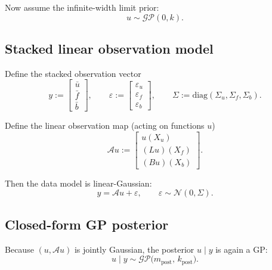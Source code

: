 \documentclass[11pt]{article}
\begin{document}
Now assume the infinite-width limit prior:
\begin{equation}
u \sim \mathcal{GP}(0,k).
\end{equation}

\subsection{Stacked linear observation model}

Define the stacked observation vector
\begin{equation}
y := \begin{bmatrix}
\bar u\\ \bar f\\ \bar b
\end{bmatrix},
\qquad
\varepsilon := \begin{bmatrix}
\varepsilon_u\\ \varepsilon_f\\ \varepsilon_b
\end{bmatrix},
\qquad
\Sigma := \mathrm{diag}(\Sigma_u,\Sigma_f,\Sigma_b).
\end{equation}

Define the linear observation map (acting on functions $u$)
\begin{equation}
\mathcal A u :=
\begin{bmatrix}
u(X_u)\\ (Lu)(X_f)\\ (Bu)(X_b)
\end{bmatrix}.
\end{equation}

Then the data model is linear-Gaussian:
\begin{equation}
y = \mathcal A u + \varepsilon,\qquad \varepsilon\sim \mathcal N(0,\Sigma).
\end{equation}

\subsection{Closed-form GP posterior}

Because $(u,\mathcal A u)$ is jointly Gaussian, the posterior $u\mid y$ is again a GP:
\begin{equation}
u\mid y \sim \mathcal{GP}\big(m_{\text{post}},\,k_{\text{post}}\big).
\end{equation}
\end{document}
